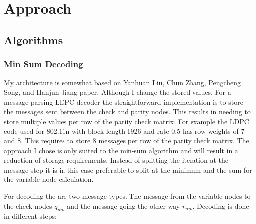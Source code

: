 
\chapter{Approach} \label{chap_approach}
\section{Algorithms}
\subsection{Min Sum Decoding}
My architecture is somewhat based on  Yanhuan Liu, Chun Zhang, Pengcheng Song, and Hanjun Jiang\cite{LiZh17} paper. Although I change the stored values. For a message parsing LDPC decoder the straightforward implementation is to store the messages sent between the check and parity nodes. This results in needing to store multiple values per row of the parity check matrix. For example the LDPC code used for 802.11n with block length 1926 and rate 0.5 has row weights of 7 and 8. This requires to store 8 messages per row of the parity check matrix. The approach I chose is only suited to the min-sum algorithm and will result in a reduction of storage requirements. Instead of splitting the iteration at the message step it is in this case preferable to split at the minimum and the sum for the variable node calculation.

For decoding the are two message types. The message from the variable nodes to the check nodes $q_{nm}$ and the message going the other way $r_{nm}$. Decoding is done in different steps\cite{EmEl14}:

